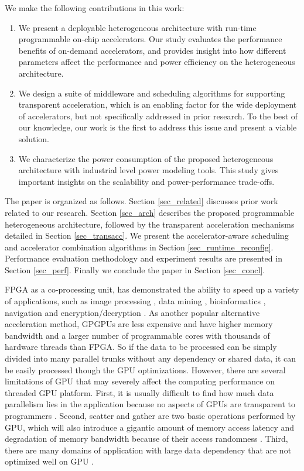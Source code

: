 We make the following contributions in this work:
\begin{enumerate}

\item We present a deployable heterogeneous architecture with run-time
  programmable on-chip accelerators. Our study evaluates the
  performance benefits of on-demand accelerators, and provides insight into how different parameters affect the performance and power efficiency on the heterogeneous architecture.

\item We design a suite of middleware and scheduling algorithms for
  supporting transparent acceleration, which is an enabling factor for
  the wide deployment of accelerators, but not specifically addressed in
  prior research. To the best of our knowledge, our work is the first
  to address this issue and present a viable solution.

\item We characterize the power consumption of the proposed
  heterogeneous architecture with industrial level power modeling
  tools. This study gives important insights on the scalability and
  power-performance trade-offs.

\end{enumerate}

The paper is organized as follows. Section \ref{sec_related} discusses
prior work related to our research. Section \ref{sec_arch} describes
the proposed programmable heterogeneous architecture, followed by the
transparent acceleration mechanisms detailed in Section
\ref{sec_transacc}. We present the accelerator-aware scheduling and
accelerator combination algorithms in Section
\ref{sec_runtime_reconfig}. Performance evaluation methodology and
experiment results are presented in Section \ref{sec_perf}. Finally we
conclude the paper in Section \ref{sec_concl}.

  FPGA as a
co-processing unit, has demonstrated the ability to speed up a variety
of applications, such as image processing \cite{imageacc}, data mining
\cite{data-mining-ref}, bioinformatics \cite{bioacc1} \cite{bioacc2},
navigation \cite{naviacc} and encryption/decryption
\cite{encryptionacc}. As another popular alternative acceleration
method, GPGPUs are less expensive and have higher memory bandwidth and
a larger number of programmable cores with thousands of hardware
threads than FPGA. So if the data to be processed can be simply
divided into many parallel trunks without any dependency or shared
data, it can be easily processed though the GPU
optimizations. However, there are several limitations of GPU that may
severely affect the computing performance on threaded GPU
platform. First, it is usually difficult to find how much data
parallelism lies in the application because no aspects of GPUs are
transparent to programmers \cite{microsoft06}. Second, scatter and
gather are two basic operations performed by GPU, which will also
introduce a gigantic amount of memory access latency and degradation
of memory bandwidth because of their access randomness
\cite{GPUlimit1}. Third, there are many domains of application with
large data dependency that are not optimized well on GPU
\cite{GPUlimit2}.  \fi
